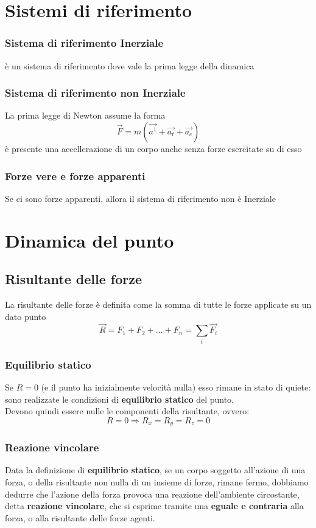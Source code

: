 \documentclass[a4paper]{report}
\begin{document}
  \chapter{Sistemi di riferimento}
  \subsection{Sistema di riferimento Inerziale}
  è un sistema di riferimento dove vale la prima legge della dinamica
  \subsection{Sistema di riferimento non Inerziale}
  La prima legge di Newton assume la forma
  \[ \vec{F} = m(\vec{a^1} + \vec{a_t} + \vec{a_c}) \]
  è presente una accellerazione di un corpo anche senza forze esercitate su di esso
  \subsection{Forze vere e forze apparenti}
  Se ci sono forze apparenti, allora il sistema di riferimento non è Inerziale

  \chapter{Dinamica del punto}

  \section{Risultante delle forze}
  La risultante delle forze è definita come la somma di tutte le forze applicate su un dato punto
  \[ \vec{R} = F_1 + F_2 + ... + F_n = \sum_{i} \vec{F_i} \]

  \subsection{Equilibrio statico}
  Se $R = 0$ (e il punto ha inizialmente velocità nulla) esso rimane in stato di quiete: sono realizzate le condizioni di \textbf{equilibrio statico} del punto.\\
  Devono quindi essere nulle le componenti della risultante, ovvero:
  \[ R = 0 \Rightarrow R_x = R_y = R_z = 0 \]

  \subsection{Reazione vincolare}
  Data la definizione di \textbf{equilibrio statico}, se un corpo soggetto all'azione di una forza, o della risultante non nulla di un insieme di forze, rimane fermo, dobbiamo dedurre che l'azione della forza provoca una reazione dell'ambiente circostante, detta \textbf{reazione vincolare}, che si esprime tramite una \textbf{eguale e contraria} alla forza, o alla risultante delle forze agenti.
\end{document}
